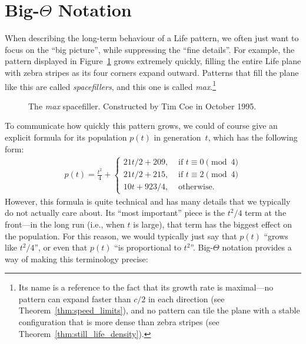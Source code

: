 \section{Big-$\Theta$ Notation}\label{sec:bigO}

When describing the long-term behaviour of a Life pattern, we often just want to focus on the ``big picture'', while suppressing the ``fine details''. For example, the pattern displayed in Figure~\ref{fig:max} grows extremely quickly, filling the entire Life plane with zebra stripes as its four corners expand outward. Patterns that fill the plane like this are called \emph{spacefillers}, and this one is called \emph{max}.\footnote{Its name is a reference to the fact that its growth rate is maximal---no pattern can expand faster than $c/2$ in each direction (see Theorem~\ref{thm:speed_limits}), and no pattern can tile the plane with a stable configuration that is more dense than zebra stripes (see Theorem~\ref{thm:still_life_density}).}

\begin{figure}[!htb]
	\centering
	\caption{The \emph{max} spacefiller. Constructed by Tim Coe in October 1995.}\label{fig:max}
\end{figure}

To communicate how quickly this pattern grows, we could of course give an explicit formula for its population $p(t)$ in generation~$t$, which has the following form:
\begin{align}\label{eq:max_population_formula}
	p(t) = \frac{t^2}{4} + \begin{cases}
		21t/2 + 209, & \text{ if } t \equiv 0 \pmod{4} \\
		21t/2 + 215, & \text{ if } t \equiv 2 \pmod{4} \\
		10t + 923/4, & \text{ otherwise}.
	\end{cases}
\end{align}
However, this formula is quite technical and has many details that we typically do not actually care about. Its ``most important'' piece is the $t^2/4$ term at the front---in the long run (i.e., when $t$ is large), that term has the biggest effect on the population. For this reason, we would typically just say that $p(t)$ ``grows like $t^2/4$'', or even that $p(t)$ ``is proportional to $t^2$''. Big-$\Theta$ notation provides a way of making this terminology precise:

